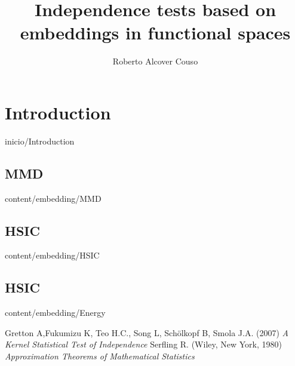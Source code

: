 \documentclass[epsbased,copyright,final,printable,covers,extendedindex,firstnumbered,tfg,gnuplot]{tfgtfmthesisuam}
\title[Independence tests]{Independence tests based on embeddings in functional spaces}
\author{Roberto Alcover Couso}
\begin{document}
\chapter{Introduction\label{CAP:INTRODUCCION}}{inicio/Introduction}
	\section{MMD\label{SEC:MMD}}{content/embedding/MMD}
	\section{HSIC\label{SEC:HSIC}}{content/embedding/HSIC}
	\section{HSIC\label{SEC:Energy}}{content/embedding/Energy}
\begin{thebibliography}{9}
 Gretton A,Fukumizu K, Teo H.C., Song L, Schölkopf B, Smola J.A.
(2007)
\textit{A Kernel Statistical Test of Independence}
 Serfling R.
(Wiley, New York, 1980)
\textit{Approximation Theorems of Mathematical Statistics}

\end{thebibliography}
\end{document}
